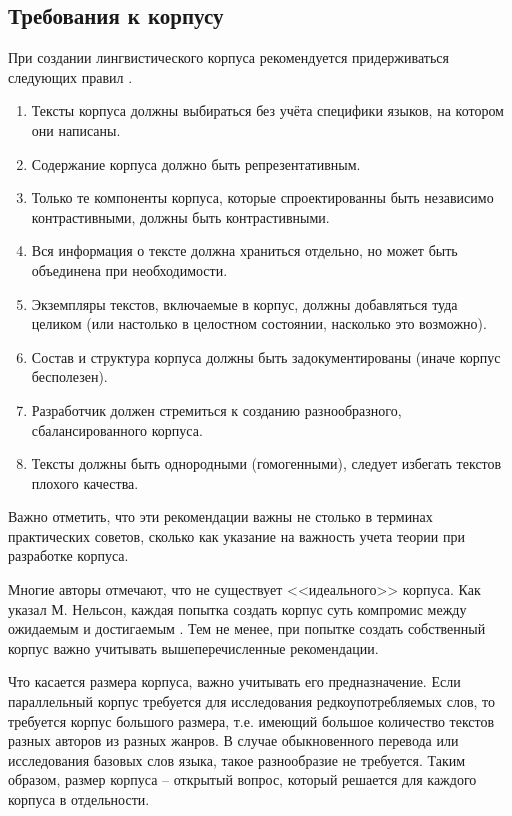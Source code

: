 \subsection{Требования к корпусу}

При создании лингвистического корпуса рекомендуется придерживаться следующих правил \cite{szudarski-corpus-linguistics-for-vocab-2017}.

\begin{enumerate}
	\item Тексты корпуса должны выбираться без учёта специфики языков, на котором они написаны.
	
	\item Содержание корпуса должно быть репрезентативным.
	
	\item Только те компоненты корпуса, которые спроектированны быть независимо контрастивными, должны быть контрастивными.
	
	\item Вся информация о тексте должна храниться отдельно, но может быть объединена при необходимости.
	
	\item Экземпляры текстов, включаемые в корпус, должны добавляться туда целиком (или настолько в целостном состоянии, насколько это возможно).
	
	\item Состав и структура корпуса должны быть задокументированы (иначе корпус бесполезен).
	
	\item Разработчик должен стремиться к созданию разнообразного, сбалансированного корпуса. 
	
	\item Тексты должны быть однородными (гомогенными), следует избегать текстов плохого качества.
\end{enumerate}

Важно отметить, что эти рекомендации важны не столько в терминах практических советов, сколько как указание на важность учета теории при разработке корпуса.

Многие авторы отмечают, что не существует <<идеального>> корпуса. Как указал М. Нельсон, каждая попытка создать корпус суть компромис между ожидаемым и достигаемым \cite{nelson-building-written-corpus-2010}. 
Тем не менее, при попытке создать собственный корпус важно учитывать вышеперечисленные рекомендации.

Что касается размера корпуса, важно учитывать его предназначение. 
Если параллельный корпус требуется для исследования редкоупотребляемых слов, то требуется корпус большого размера, т.е. имеющий большое количество текстов разных авторов из разных жанров. 
В случае обыкновенного перевода или исследования базовых слов языка, такое разнообразие не требуется. 
Таким образом, размер корпуса -- открытый вопрос, который решается для каждого корпуса в отдельности.

